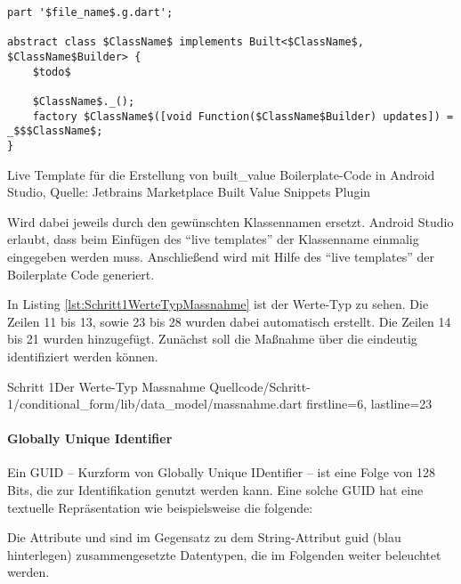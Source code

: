 \ifincludeall
  \begin{listing}[h]
    \begin{verbatim}
part '$file_name$.g.dart';

abstract class $ClassName$ implements Built<$ClassName$, $ClassName$Builder> {
    $todo$
    
    $ClassName$._();
    factory $ClassName$([void Function($ClassName$Builder) updates]) = _$$$ClassName$;
}

\end{verbatim}
    \caption[built_value Live Template]{Live Template für die Erstellung von built_value Boilerplate-Code in Android Studio, Quelle: Jetbrains Marketplace Built Value Snippets Plugin}
    \label{lst:BuiltValueLiveTemplate}
  \end{listing}
\fi

 Wird dabei jeweils durch den gewünschten Klassennamen ersetzt.
Android Studio erlaubt, dass beim Einfügen des \enquote{live templates} der Klassenname einmalig eingegeben werden muss.  Anschließend wird mit Hilfe des \enquote{live templates} der Boilerplate Code generiert.

In Listing \ref{lst:Schritt1WerteTypMassnahme} ist der Werte-Typ  zu sehen.
Die Zeilen 11 bis 13, sowie 23 bis 28 wurden dabei automatisch erstellt.
Die Zeilen 14 bis 21 wurden hinzugefügt.
Zunächst soll die Maßnahme über die  eindeutig identifiziert werden können.

\begin{alexlisting}{Schritt 1}{Der Werte-Typ Massnahme}
  {Quellcode/Schritt-1/conditional_form/lib/data_model/massnahme.dart}
  {firstline=6, lastline=23}
  \label{lst:Schritt1WerteTypMassnahme}
\end{alexlisting}

\paragraph{Globally Unique Identifier}
Ein GUID – Kurzform von Globally Unique IDentifier – ist  eine Folge von 128 Bits, die zur Identifikation genutzt werden kann.
Eine solche GUID hat eine textuelle Repräsentation wie beispielsweise die folgende: 


Die Attribute  und  sind im Gegensatz zu dem String-Attribut guid (blau hinterlegen) zusammengesetzte Datentypen, die im Folgenden weiter beleuchtet werden.

